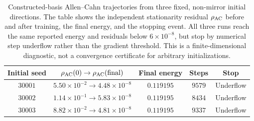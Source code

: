 \begin{table}[t]
\centering
\small
\setlength{\tabcolsep}{5pt}
\begin{tabular}{@{}ccccc@{}}
\hline
Initial seed & $\rho_{\rm AC}(0)\to\rho_{\rm AC}(\mathrm{final})$ & Final energy & Steps & Stop \\
\hline
$30001$ & $5.50\times10^{-2}\to4.48\times10^{-8}$ & $0.119195$ & $9579$ & Underflow \\
$30002$ & $1.14\times10^{-1}\to5.83\times10^{-8}$ & $0.119195$ & $8434$ & Underflow \\
$30003$ & $8.82\times10^{-2}\to4.81\times10^{-8}$ & $0.119195$ & $9337$ & Underflow \\
\hline
\end{tabular}
\caption{Constructed-basis Allen--Cahn trajectories from three fixed, non-mirror initial directions.  The table shows the independent stationarity residual $\rho_{\rm AC}$ before and after training, the final energy, and the stopping event.  All three runs reach the same reported energy and residuals below $6\times10^{-8}$, but stop by numerical step underflow rather than the gradient threshold.  This is a finite-dimensional diagnostic, not a convergence certificate for arbitrary initializations.}
\label{tab:ex2-c-supplement}
\end{table}

